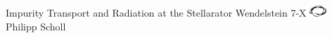 \documentclass[12pt]{report}
\begin{document}
\thispagestyle{empty}%
%
\begin{landscape}%

    \vspace*{1cm}%
    \hspace*{2.cm}%
    \footnotesize{
    }%
    \normalsize%
    \hfill%
    Impurity Transport and Radiation at the Stellarator Wendelstein 7-X%
    \hfill%
    \includegraphics[height=12pt]{spine_fs.png}%
    \hfill%
    Philipp Scholl%
    \hspace*{2.cm}%

\end{landscape}%
%
\end{document}
